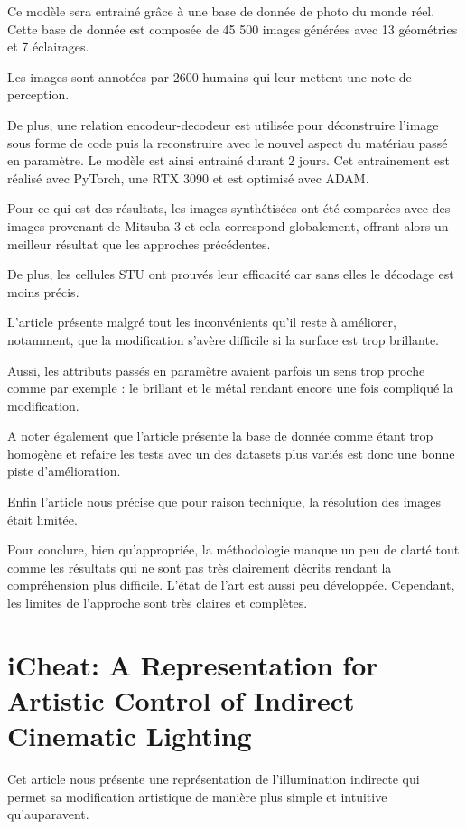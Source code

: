 \documentclass{article}
\begin{document}
Ce modèle sera entrainé grâce à une base de donnée de photo du monde réel. Cette base de donnée est composée de 45 500 images générées avec 13 géométries et 7 éclairages.

Les images sont annotées par 2600 humains qui leur mettent une note de perception.

De plus, une relation encodeur-decodeur est utilisée pour déconstruire l’image sous forme de code puis la reconstruire avec le nouvel aspect du matériau passé en paramètre. Le modèle est ainsi entrainé durant 2 jours. Cet entrainement est réalisé avec PyTorch, une RTX 3090 et est optimisé avec ADAM.

Pour ce qui est des résultats, les images synthétisées ont été comparées avec des images provenant de Mitsuba 3 et cela correspond globalement, offrant alors un meilleur résultat que les approches précédentes.

De plus, les cellules STU ont prouvés leur efficacité car sans elles le décodage est moins précis.

L’article présente malgré tout les inconvénients qu’il reste à améliorer, notamment, que la modification s’avère difficile si la surface est trop brillante.

Aussi, les attributs passés en paramètre avaient parfois un sens trop proche comme par exemple : le brillant et le métal rendant encore une fois compliqué la modification.

A noter également que l’article présente la base de donnée comme étant trop homogène et refaire les tests avec un des datasets plus variés est donc une bonne piste d’amélioration.

Enfin l’article nous précise que pour raison technique, la résolution des images était limitée.

Pour conclure, bien qu’appropriée, la méthodologie manque un peu de clarté tout comme les résultats qui ne sont pas très clairement décrits rendant la compréhension plus difficile. L’état de l’art est aussi peu développée. Cependant, les limites de l’approche sont très claires et complètes.

\section{iCheat: A Representation for Artistic Control of Indirect Cinematic Lighting}

Cet article nous présente une représentation de l'illumination indirecte qui permet sa modification artistique de manière plus simple et intuitive qu'auparavent.
\end{document}
